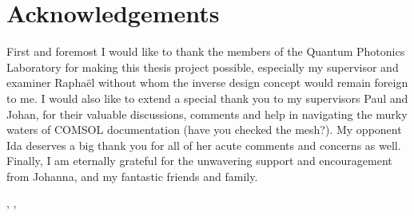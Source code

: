 \thispagestyle{plain}           %
\section*{Acknowledgements}

First and foremost I would like to thank the members of the Quantum Photonics
Laboratory for making this thesis project possible,
especially my supervisor and examiner Raphaël without whom the inverse design
concept would remain foreign to me.
I would also like to extend a special thank you to my supervisors Paul and Johan, for their valuable
discussions, comments and help in navigating the murky waters of COMSOL
documentation (have you checked the mesh?).
My opponent Ida deserves a big thank you for all of her acute comments and
concerns as well.
Finally, I am eternally grateful for the unwavering support and encouragement
from Johanna, and my fantastic friends and family.

\hfill
\thesisAuthor, \thesisCity, \thesisMonth\ \thesisYear

\if{}
\newpage                %
\thispagestyle{empty}
\mbox{}
\fi
